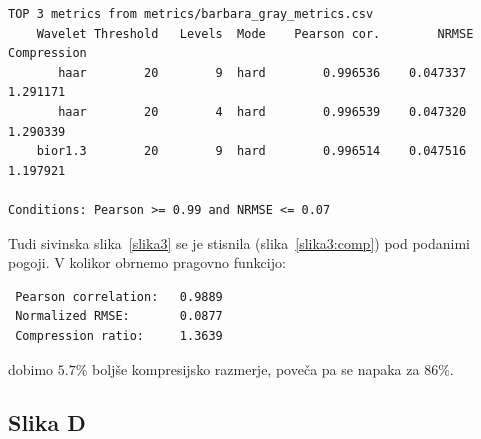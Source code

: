 \documentclass[a4paper,11pt]{article}
\begin{document}
\begin{verbatim}
TOP 3 metrics from metrics/barbara_gray_metrics.csv
	Wavelet	Threshold	Levels	Mode	Pearson cor.	    NRMSE	Compression
	   haar	       20	     9	hard	    0.996536 	0.047337	   1.291171
	   haar	       20	     4	hard	    0.996539 	0.047320	   1.290339
	bior1.3	       20	     9	hard	    0.996514 	0.047516	   1.197921

Conditions: Pearson >= 0.99	and	NRMSE <= 0.07
\end{verbatim}
Tudi sivinska slika~\ref{slika3} se je stisnila (slika~\ref{slika3:comp}) pod podanimi pogoji. V kolikor obrnemo pragovno funkcijo:
\begin{verbatim}
 Pearson correlation:	0.9889
 Normalized RMSE:		0.0877
 Compression ratio:		1.3639
\end{verbatim}
dobimo $5.7\%$ boljše kompresijsko razmerje, poveča pa se napaka za $86\%$.

\subsection{Slika D}
\end{document}
